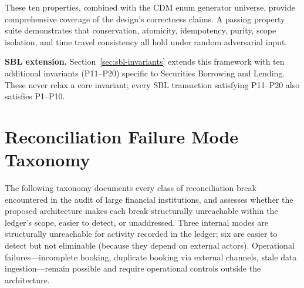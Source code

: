 \documentclass[11pt,a4paper]{article}
\begin{document}
\noindent These ten properties, combined with the CDM enum generator universe, provide comprehensive coverage of the design's correctness claims. A passing property suite demonstrates that conservation, atomicity, idempotency, purity, scope isolation, and time travel consistency all hold under random adversarial input.

\noindent\textbf{SBL extension.} Section~\ref{sec:sbl-invariants} extends this framework with ten additional invariants (P11--P20) specific to Securities Borrowing and Lending. These never relax a core invariant; every SBL transaction satisfying P11--P20 also satisfies P1--P10.

\section{Reconciliation Failure Mode Taxonomy}
\label{app:reconciliation}

The following taxonomy documents every class of reconciliation break encountered in the audit of large financial institutions, and assesses whether the proposed architecture makes each break structurally unreachable within the ledger's scope, easier to detect, or unaddressed. Three internal modes are structurally unreachable for activity recorded in the ledger; six are easier to detect but not eliminable (because they depend on external actors). Operational failures---incomplete booking, duplicate booking via external channels, stale data ingestion---remain possible and require operational controls outside the architecture.
\end{document}
